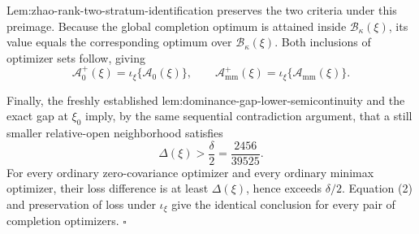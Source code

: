 Lem:zhao-rank-two-stratum-identification preserves the two criteria under this preimage.  Because the global completion optimum is attained inside \(\mathcal B_\kappa(\xi)\), its value equals the corresponding optimum over \(\mathcal B_\kappa(\xi)\).  Both inclusions of optimizer sets follow, giving
\[
\mathcal A_0^+(\xi)=\iota_\xi\{\mathcal A_0(\xi)\},
\qquad
\mathcal A_{\mathrm{mm}}^+(\xi)=\iota_\xi\{\mathcal A_{\mathrm{mm}}(\xi)\}. \tag{2}
\]

Finally, the freshly established lem:dominance-gap-lower-semicontinuity and the exact gap at \(\xi_0\) imply, by the same sequential contradiction argument, that a still smaller relative-open neighborhood satisfies
\[
\Delta(\xi)>\frac\delta2=\frac{2456}{39525}.
\]
For every ordinary zero-covariance optimizer and every ordinary minimax optimizer, their loss difference is at least \(\Delta(\xi)\), hence exceeds \(\delta/2\).  Equation (2) and preservation of loss under \(\iota_\xi\) give the identical conclusion for every pair of completion optimizers. \(\square\)
